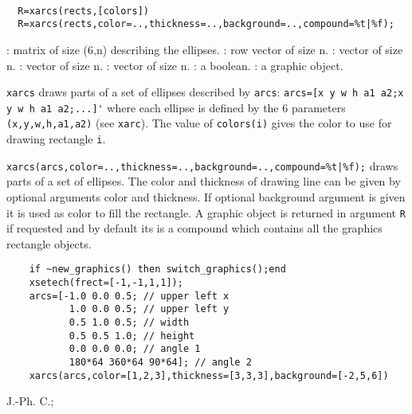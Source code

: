 
\begin{mandesc}
  \\ %
\end{mandesc}
\begin{calling_sequence}
\begin{verbatim}
  R=xarcs(rects,[colors])
  R=xarcs(rects,color=..,thickness=..,background=..,compound=%t|%f);
\end{verbatim}
\end{calling_sequence}

\begin{parameters}
  \begin{varlist}
    : matrix of size (6,n) describing the ellipses.
    : row vector of size n.
    : vector of size n.
    : vector of size n.
    : vector of size n.
    : a boolean.
    : a graphic object.
  \end{varlist}
\end{parameters}

\begin{mandescription}
  \verb!xarcs! draws parts of a set of ellipses described by \verb!arcs!: 
  \verb!arcs=[x y w h a1 a2;x y w h a1 a2;...]'! where each ellipse is defined 
  by the 6 parameters \verb!(x,y,w,h,a1,a2)! (see \verb!xarc!).
  The value of \verb!colors(i)! gives the color to use for drawing rectangle \verb!i!.

  \verb!xarcs(arcs,color=..,thickness=..,background=..,compound=%t|%f);! 
  draws parts of a set of ellipses. The color and thickness of drawing line can be given by optional arguments
  color and thickness. If optional background argument is given it is used as color to fill
  the rectangle. A graphic object is returned in argument \verb!R! if requested and by default
  its is a compound which contains all the graphics rectangle objects.
\end{mandescription}

\begin{examples}
  \begin{Verbatim}
    if ~new_graphics() then switch_graphics();end
    xsetech(frect=[-1,-1,1,1]);
    arcs=[-1.0 0.0 0.5; // upper left x
           1.0 0.0 0.5; // upper left y
           0.5 1.0 0.5; // width
           0.5 0.5 1.0; // height
           0.0 0.0 0.0; // angle 1
           180*64 360*64 90*64]; // angle 2
    xarcs(arcs,color=[1,2,3],thickness=[3,3,3],background=[-2,5,6])
  \end{Verbatim}
\end{examples}

\begin{manseealso}
     
\end{manseealso}


\begin{authors}
  J.-Ph. C.;   
\end{authors}

